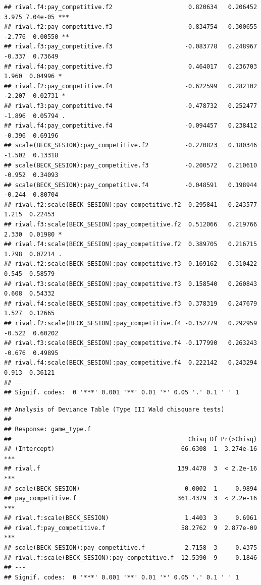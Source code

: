 \documentclass[
]{article}
\begin{document}
\begin{verbatim}
## rival.f4:pay_competitive.f2                     0.820634   0.206452   3.975 7.04e-05 ***
## rival.f2:pay_competitive.f3                    -0.834754   0.300655  -2.776  0.00550 ** 
## rival.f3:pay_competitive.f3                    -0.083778   0.248967  -0.337  0.73649    
## rival.f4:pay_competitive.f3                     0.464017   0.236703   1.960  0.04996 *  
## rival.f2:pay_competitive.f4                    -0.622599   0.282102  -2.207  0.02731 *  
## rival.f3:pay_competitive.f4                    -0.478732   0.252477  -1.896  0.05794 .  
## rival.f4:pay_competitive.f4                    -0.094457   0.238412  -0.396  0.69196    
## scale(BECK_SESION):pay_competitive.f2          -0.270823   0.180346  -1.502  0.13318    
## scale(BECK_SESION):pay_competitive.f3          -0.200572   0.210610  -0.952  0.34093    
## scale(BECK_SESION):pay_competitive.f4          -0.048591   0.198944  -0.244  0.80704    
## rival.f2:scale(BECK_SESION):pay_competitive.f2  0.295841   0.243577   1.215  0.22453    
## rival.f3:scale(BECK_SESION):pay_competitive.f2  0.512066   0.219766   2.330  0.01980 *  
## rival.f4:scale(BECK_SESION):pay_competitive.f2  0.389705   0.216715   1.798  0.07214 .  
## rival.f2:scale(BECK_SESION):pay_competitive.f3  0.169162   0.310422   0.545  0.58579    
## rival.f3:scale(BECK_SESION):pay_competitive.f3  0.158540   0.260843   0.608  0.54332    
## rival.f4:scale(BECK_SESION):pay_competitive.f3  0.378319   0.247679   1.527  0.12665    
## rival.f2:scale(BECK_SESION):pay_competitive.f4 -0.152779   0.292959  -0.522  0.60202    
## rival.f3:scale(BECK_SESION):pay_competitive.f4 -0.177990   0.263243  -0.676  0.49895    
## rival.f4:scale(BECK_SESION):pay_competitive.f4  0.222142   0.243294   0.913  0.36121    
## ---
## Signif. codes:  0 '***' 0.001 '**' 0.01 '*' 0.05 '.' 0.1 ' ' 1
\end{verbatim}

\begin{verbatim}
## Analysis of Deviance Table (Type III Wald chisquare tests)
## 
## Response: game_type.f
##                                                 Chisq Df Pr(>Chisq)    
## (Intercept)                                   66.6308  1  3.274e-16 ***
## rival.f                                      139.4478  3  < 2.2e-16 ***
## scale(BECK_SESION)                             0.0002  1     0.9894    
## pay_competitive.f                            361.4379  3  < 2.2e-16 ***
## rival.f:scale(BECK_SESION)                     1.4403  3     0.6961    
## rival.f:pay_competitive.f                     58.2762  9  2.877e-09 ***
## scale(BECK_SESION):pay_competitive.f           2.7158  3     0.4375    
## rival.f:scale(BECK_SESION):pay_competitive.f  12.5390  9     0.1846    
## ---
## Signif. codes:  0 '***' 0.001 '**' 0.01 '*' 0.05 '.' 0.1 ' ' 1
\end{verbatim}
\end{document}
